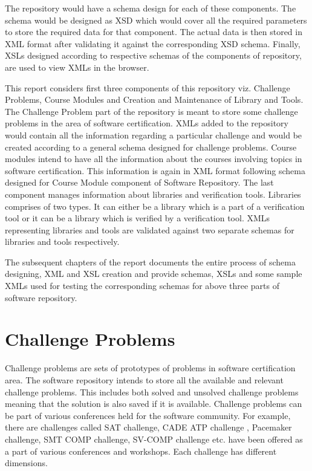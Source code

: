 \documentclass[11pt,letterpaper]{report}
\begin{document}
The repository would have a schema design for each of these components. The schema would be designed as XSD which would cover all the required parameters to store the required data for that component. The actual data is then stored in XML format after validating it against the corresponding XSD schema. Finally, XSLs designed according to respective schemas of the components of repository, are used to view XMLs  in the browser. 

This report considers first three components of this repository viz. Challenge Problems, Course Modules and Creation and Maintenance of Library and Tools. The Challenge Problem part of the repository is meant to store some challenge problems in the area of software certification. XMLs added to the repository would contain all the information regarding a particular challenge and would be created according to a general schema designed for challenge problems. Course modules intend to have all the information about the courses involving topics in software certification. This information is again in XML format following schema designed for Course Module component of Software Repository. The last component manages information about libraries and verification tools. Libraries comprises of two types. It can either be a library which is a part of a verification tool or it can be a library which is verified by a verification tool. XMLs representing libraries and tools are validated against two separate schemas for libraries and tools respectively. 

The subsequent chapters of the report documents the entire process of schema designing, XML and XSL creation and provide schemas, XSLs and some sample XMLs used for testing the corresponding schemas for above three parts of software repository.  

\chapter{Challenge Problems}

Challenge problems are sets of prototypes of problems in software certification area. The software repository intends to store all the available and relevant challenge problems. This includes both solved and unsolved challenge problems meaning that the solution is also saved if it is available. Challenge problems can be part of various conferences held for the software community. For example, there are challenges called SAT challenge, CADE ATP  challenge , Pacemaker challenge, SMT COMP challenge, SV-COMP challenge \cite{SAT,CADE,Pacemaker,SMT,SV} etc. have been offered as a part of various conferences and workshops. Each challenge has different dimensions. 
\end{document}
